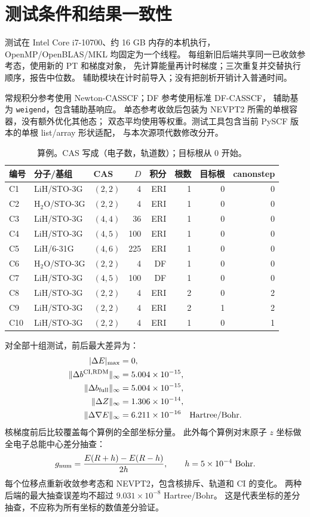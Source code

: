 \documentclass[UTF8,a4paper,11pt,fontset=fandol]{ctexart}
\newcommand{\CI}{\mathrm{CI}}
\begin{document}
\section{测试条件和结果一致性}
测试在 Intel Core i7-10700、约 16 GB 内存的本机执行，
OpenMP/OpenBLAS/MKL 均固定为一个线程。
每组新旧后端共享同一已收敛参考态，使用新的 PT 和梯度对象，
先计算能量再计时梯度；三次重复并交替执行顺序，报告中位数。
辅助模块在计时前导入；没有把剖析开销计入普通时间。

常规积分参考使用 Newton-CASSCF；DF 参考使用标准 DF-CASSCF，
辅助基为 \texttt{weigend}，包含辅助基响应。
单态参考收敛后包装为 NEVPT2 所需的单根容器，没有额外优化其他态；
双态平均使用等权重。测试工具包含当前 PySCF 版本的单根 list/array 形状适配，
与本次源项代数修改分开。

\begin{table}[htbp]\centering\small
\caption{算例。CAS 写成（电子数，轨道数）；目标根从 0 开始。}
\begin{tabular}{lllrrrrr}\toprule
编号 & 分子/基组 & CAS & $D$ & 积分 & 根数 & 目标根 & canonstep\\\midrule
C1 & LiH/STO-3G & $(2,2)$ & 4 & ERI & 1 & 0 & 0 \\
C2 & H$_2$O/STO-3G & $(2,2)$ & 4 & ERI & 1 & 0 & 0 \\
C3 & LiH/STO-3G & $(4,4)$ & 36 & ERI & 1 & 0 & 0 \\
C4 & LiH/STO-3G & $(4,5)$ & 100 & ERI & 1 & 0 & 0 \\
C5 & LiH/6-31G & $(4,6)$ & 225 & ERI & 1 & 0 & 0 \\
C6 & H$_2$O/STO-3G & $(2,2)$ & 4 & DF & 1 & 0 & 0 \\
C7 & LiH/STO-3G & $(4,5)$ & 100 & DF & 1 & 0 & 0 \\
C8 & LiH/STO-3G & $(2,2)$ & 4 & ERI & 2 & 0 & 2 \\
C9 & LiH/STO-3G & $(2,2)$ & 4 & ERI & 2 & 1 & 2 \\
C10 & LiH/STO-3G & $(2,2)$ & 4 & ERI & 1 & 0 & 1 \\
\bottomrule\end{tabular}
\end{table}

对全部十组测试，前后最大差异为：
\begin{align*}
 |\Delta E|_{\max}&=0,\\
 \|\Delta b^{\CI,\mathrm{RDM}}\|_\infty
 &=5.004\times10^{-15},\\
 \|\Delta b_{\rm full}\|_\infty
 &=5.004\times10^{-15},\\
 \|\Delta Z\|_\infty&=1.306\times10^{-14},\\
 \|\Delta\nabla E\|_\infty&=6.211\times10^{-16}
 \quad\text{Hartree/Bohr}.
\end{align*}
核梯度前后比较覆盖每个算例的全部坐标分量。
此外每个算例对末原子 $z$ 坐标做全电子总能中心差分抽查：
\[
 g_{\rm num}=\frac{E(R+h)-E(R-h)}{2h},\qquad h=5\times10^{-4}\ {\rm Bohr}.
\]
每个位移点重新收敛参考态和 NEVPT2，包含核排斥、轨道和 CI 的变化。
两种后端的最大抽查误差均不超过
$9.031\times10^{-8}$ Hartree/Bohr。
这是代表坐标的差分抽查，不应称为所有坐标的数值差分验证。
\end{document}
